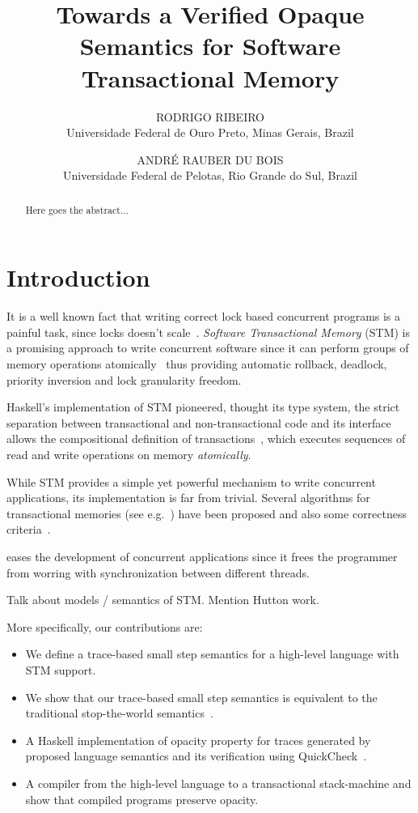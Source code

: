 \documentclass{jfp1}
\title[Journal of Functional Programming]
      {Towards a Verified Opaque Semantics for Software Transactional Memory}
\author[R. Ribeiro]
        {RODRIGO RIBEIRO \\
         Universidade Federal de Ouro Preto, Minas Gerais, Brazil\\
         \email{rodrigo@decsi.ufop.br}}
\author[A. Du Bois]
       {ANDR\'E RAUBER DU BOIS\\
        Universidade Federal de Pelotas, Rio Grande do Sul, Brazil\\
        \email{dubois@inf.ufpel.br}}
\begin{document}
\label{firstpage}

\maketitle

\begin{abstract}
Here goes the abstract...
\end{abstract}


\section{Introduction}

It is a well known fact that writing correct lock based concurrent
programs is a painful task, since locks doesn't scale~\cite{Harris05}.
\emph{Software Transactional Memory} (STM) is a promising approach to
write concurrent software since it can perform groups of memory
operations atomically~\cite{Shavit95} thus providing automatic
rollback, deadlock, priority inversion and lock granularity freedom.

Haskell's implementation of STM pioneered, thought its type system,
the strict separation between transactional and non-transactional
code and its interface allows the compositional definition of 
transactions~\cite{Harris05}, which executes sequences of read 
and write operations on memory \emph{atomically}.

While STM provides a simple yet powerful mechanism to write concurrent
applications, its implementation is far from trivial. Several
algorithms for transactional memories (see e.g.~\cite{Dice06}) have
been proposed and also some correctness criteria~\cite{LesaniP14,Guerraoui2008}.

eases the development of concurrent applications since it
frees the programmer from worring with synchronization between
different threads.

Talk about models / semantics of STM. Mention Hutton work.

More specifically, our contributions are:

\begin{itemize}
   \item We define a trace-based small step semantics for a high-level 
             language with STM support.
   \item We show that our trace-based small step semantics is
             equivalent to the traditional stop-the-world semantics~\cite{Hu09}.      
   \item A Haskell implementation of opacity property for traces
             generated by proposed language semantics and its verification
             using QuickCheck~\cite{Claessen00}.
    \item A compiler from the high-level language to a transactional
             stack-machine and show that compiled programs preserve
             opacity.
\end{itemize}
\end{document}
